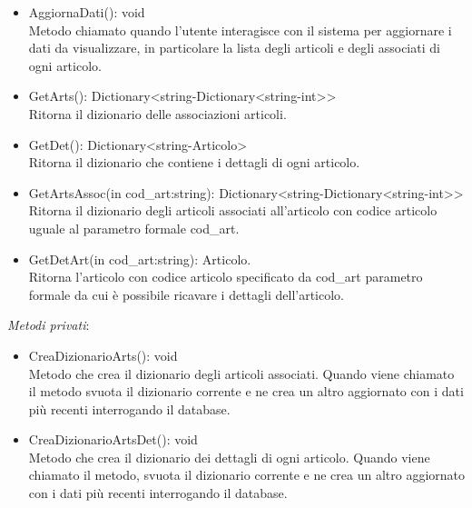 \begin{itemize}
    \item AggiornaDati(): void \\
    Metodo chiamato quando l'utente interagisce con il sistema per aggiornare i dati da visualizzare, in particolare la lista degli articoli e degli associati di ogni articolo.
    \item GetArts(): Dictionary<string-Dictionary<string-int>> \\
    Ritorna il dizionario delle associazioni articoli.
    \item GetDet(): Dictionary<string-Articolo> \\
    Ritorna il dizionario che contiene i dettagli di ogni articolo.
    \item GetArtsAssoc(in cod\_art:string): Dictionary<string-Dictionary<string-int>> \\
    Ritorna il dizionario degli articoli associati all'articolo con codice articolo uguale al parametro formale cod\_art.
    \item GetDetArt(in cod\_art:string): Articolo. \\
    Ritorna l'articolo con codice articolo specificato da cod\_art parametro formale da cui è possibile ricavare i dettagli dell'articolo.
\end{itemize} 
\textit{Metodi privati}:\\
\begin{itemize}
    \item CreaDizionarioArts(): void \\
    Metodo che crea il dizionario degli articoli associati. Quando viene chiamato il metodo svuota il dizionario corrente e ne crea un altro aggiornato con i dati più recenti 
    interrogando il database.
    \item CreaDizionarioArtsDet(): void \\
    Metodo che crea il dizionario dei dettagli di ogni articolo. Quando viene chiamato il metodo, svuota il dizionario corrente e ne crea un altro aggiornato con i dati più recenti 
    interrogando il database.
\end{itemize} 





